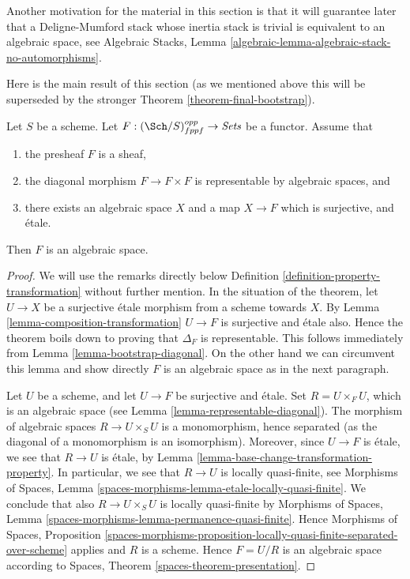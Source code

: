 \medskip\noindent
Another motivation for the material in this section is that it will guarantee
later that a Deligne-Mumford stack whose inertia stack is trivial is equivalent
to an algebraic space, see
Algebraic Stacks, Lemma \ref{algebraic-lemma-algebraic-stack-no-automorphisms}.

\medskip\noindent
Here is the main result of this section (as we mentioned above this
will be superseded by the stronger
Theorem \ref{theorem-final-bootstrap}).

\begin{theorem}
\label{theorem-bootstrap}
Let $S$ be a scheme.
Let $F : (\Sch/S)_{fppf}^{opp} \to \textit{Sets}$ be a functor.
Assume that
\begin{enumerate}
\item the presheaf $F$ is a sheaf,
\item the diagonal morphism $F  \to F \times F$ is representable by
algebraic spaces, and
\item there exists an algebraic space $X$
and a map $X \to F$ which is surjective, and \'etale.
\end{enumerate}
Then $F$ is an algebraic space.
\end{theorem}

\begin{proof}
We will use the remarks directly below
Definition \ref{definition-property-transformation}
without further mention.
In the situation of the theorem, let $U \to X$ be a surjective \'etale morphism
from a scheme towards $X$.
By Lemma \ref{lemma-composition-transformation}
$U \to F$ is surjective and \'etale also.
Hence the theorem boils down to proving that
$\Delta_F$ is representable.
This follows immediately from
Lemma \ref{lemma-bootstrap-diagonal}.
On the other hand we can circumvent this lemma and show directly $F$
is an algebraic space as in the next paragraph.

\medskip\noindent
Let $U$ be a scheme, and let $U \to F$ be surjective and \'etale.
Set $R = U \times_F U$, which is an algebraic space (see
Lemma \ref{lemma-representable-diagonal}).
The morphism of algebraic spaces $R \to U \times_S U$ is a monomorphism,
hence separated (as the diagonal of a monomorphism is an isomorphism).
Moreover, since $U \to F$ is \'etale, we see that $R \to U$ is \'etale, by
Lemma \ref{lemma-base-change-transformation-property}.
In particular, we see that $R \to U$ is locally quasi-finite, see
Morphisms of Spaces,
Lemma \ref{spaces-morphisms-lemma-etale-locally-quasi-finite}.
We conclude that also $R \to U \times_S U$ is
locally quasi-finite by
Morphisms of Spaces,
Lemma \ref{spaces-morphisms-lemma-permanence-quasi-finite}.
Hence
Morphisms of Spaces, Proposition
\ref{spaces-morphisms-proposition-locally-quasi-finite-separated-over-scheme}
applies and $R$ is a scheme. Hence $F = U/R$ is an algebraic
space according to
Spaces, Theorem \ref{spaces-theorem-presentation}.
\end{proof}









